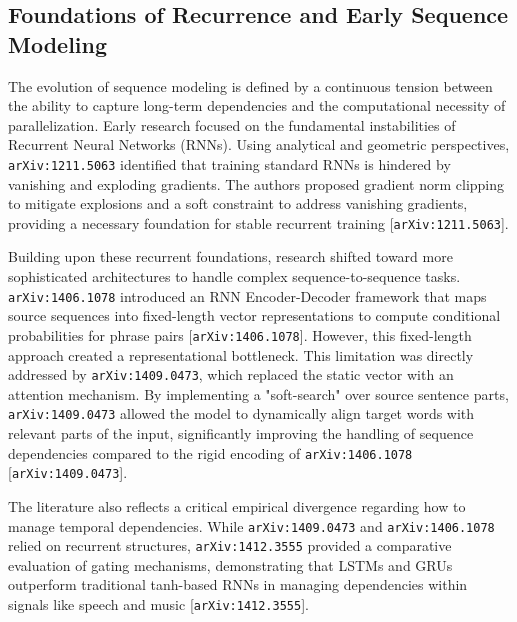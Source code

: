 \documentclass[11pt]{article}
\begin{document}
\subsection{Foundations of Recurrence and Early Sequence Modeling}

The evolution of sequence modeling is defined by a continuous tension between the ability to capture long-term dependencies and the computational necessity of parallelization. Early research focused on the fundamental instabilities of Recurrent Neural Networks (RNNs). Using analytical and geometric perspectives, \texttt{arXiv:1211.5063} identified that training standard RNNs is hindered by vanishing and exploding gradients. The authors proposed gradient norm clipping to mitigate explosions and a soft constraint to address vanishing gradients, providing a necessary foundation for stable recurrent training [\texttt{arXiv:1211.5063}].

Building upon these recurrent foundations, research shifted toward more sophisticated architectures to handle complex sequence-to-sequence tasks. \texttt{arXiv:1406.1078} introduced an RNN Encoder-Decoder framework that maps source sequences into fixed-length vector representations to compute conditional probabilities for phrase pairs [\texttt{arXiv:1406.1078}]. However, this fixed-length approach created a representational bottleneck. This limitation was directly addressed by \texttt{arXiv:1409.0473}, which replaced the static vector with an attention mechanism. By implementing a "soft-search" over source sentence parts, \texttt{arXiv:1409.0473} allowed the model to dynamically align target words with relevant parts of the input, significantly improving the handling of sequence dependencies compared to the rigid encoding of \texttt{arXiv:1406.1078} [\texttt{arXiv:1409.0473}].

The literature also reflects a critical empirical divergence regarding how to manage temporal dependencies. While \texttt{arXiv:1409.0473} and \texttt{arXiv:1406.1078} relied on recurrent structures, \texttt{arXiv:1412.3555} provided a comparative evaluation of gating mechanisms, demonstrating that LSTMs and GRUs outperform traditional tanh-based RNNs in managing dependencies within signals like speech and music [\texttt{arXiv:1412.3555}].
\end{document}
